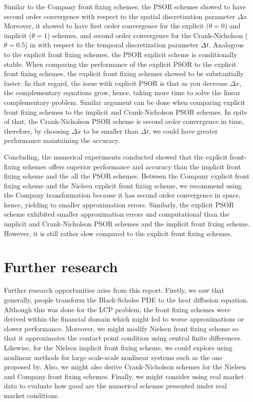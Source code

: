 Similar to the Company front fixing schemes, the PSOR schemes showed to have second order convergence with respect to the spatial discretization parameter $\Delta{x}$. Moreover, it showed to have first order convergence for the explicit ($\theta=0$) and implicit ($\theta=1$) schemes, and second order convergence for the Crank-Nicholson ($\theta=0.5$) in with respect to the temporal discretization parameter $\Delta{t}$. Analogous to the explicit front fixing schemes, the PSOR explicit scheme is conditionally stable. When comparing the performance of the explicit PSOR to the explicit front fixing schemes, the explicit front fixing schemes showed to be substantially faster. In that regard, the issue with explicit PSOR is that as you decrease $\Delta{x}$, the complementary equations grow, hence, taking more time to solve the linear complementary problem. Similar argument can be done when comparing explicit front fixing schemes to the implicit and Crank-Nicholson PSOR schemes. In spite of that, the Crank-Nicholson PSOR scheme is second order convergence in time, therefore, by choosing $\Delta{x}$ to be smaller than $\Delta{t}$, we could have greater performance maintaining the accuracy. 

Concluding, the numerical experiments conducted showed that the explicit front-fixing schemes offers superior performance and accuracy than the implicit front fixing scheme and the all the PSOR schemes. Between the Company explicit front fixing scheme and the Nielsen explicit front fixing scheme, we recommend using the Company transformation because it has second order convergence in space, hence, yielding to smaller approximation errors. Similarly, the explicit PSOR scheme exhibited smaller approximation errors and computational than the implicit and Crank-Nicholson PSOR schemes and the implicit front fixing scheme. However, it is still rather slow compared to the explicit front fixing schemes.

\section{Further research}

Further research opportunities arise from this report. Firstly, we saw that generally, people transform the Black-Scholes PDE to the heat diffusion equation. Although this was done for the LCP problem, the front fixing schemes were derived within the financial domain which might led to worse approximations or slower performance. Moreover, we might modify Nielsen front fixing scheme so that it approximates the contact point condition using central finite differences. Likewise, for the Nielsen implicit front fixing scheme, we could explore using nonlinear methods for large scale-scale nonlinear systems such as the one proposed by\cite{lacruz_2006}. Also, we might also derive Crank-Nicholson schemes for the Nielsen and Company front fixing schemes. Finally, we might consider using real market data to evaluate how good are the numerical schemes presented under real market conditions.
